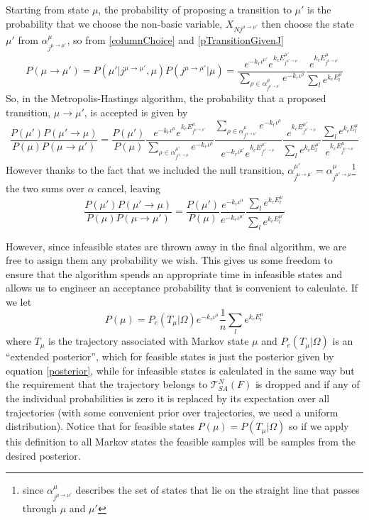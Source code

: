 \documentclass{article}
\begin{document}
Starting from state $\mu$, the probability of proposing a transition to $\mu'$ is the probability that we choose the non-basic variable, $X_{Nj^{\mu\to\mu'}}$ then choose the state $\mu'$ from $\alpha^\mu_{j^{\mu\to\mu'}}$, so from \eqref{columnChoice} and \eqref{pTransitionGivenJ}
\[
P(\mu \rightarrow \mu') 
= 
P(\mu'|j^{\mu\to\mu'},\mu)P(j^{\mu\to\mu'}|\mu) 
=
\frac{e^{-k_r \iota^{\mu'}} e^{k_cE^{\mu'}_{j^{\mu'\to\mu}}}}
	{\sum_{\rho \in \alpha^\mu_{j^{\mu\to\mu'}}}e^{-k_r\iota^\rho}}
\frac{e^{k_c E^\mu_{j^{\mu\to\mu'}}}}
	{\sum_l e^{k_c E^\mu_l}}
\]
So, in the Metropolis-Hastings algorithm, the probability that a proposed transition, $\mu\to\mu'$, is accepted is given by
\[
\frac{P(\mu')P(\mu'\to\mu)}{P(\mu)P(\mu\to\mu')} 
=
\frac{P(\mu')}
	{P(\mu)}
\frac{e^{-k_r \iota^{\mu}}e^{k_cE^{\mu}_{j^{\mu\to\mu'}}}}
	{\sum_{\rho \in \alpha^{\mu'}_{j^{\mu'\to\mu}}}e^{-k_r\iota^\rho}}
\frac{\sum_{\rho \in \alpha^{\mu}_{j^{\mu\to\mu'}}}e^{-k_r\iota^\rho}}
	{e^{-k_r \iota^{\mu'}}e^{k_cE^{\mu'}_{j^{\mu'\to\mu}}}}
\frac{e^{k_c E^{\mu'}_{j^{\mu'\to\mu}}}}
	{\sum_l e^{k_c E^{\mu'}_l}}
\frac{\sum_l e^{k_c E^\mu_l}}
	{e^{k_c E^\mu_{j^{\mu\to\mu'}}}}
\]
However thanks to the fact that we included the null transition,  $\alpha^{\mu'}_{j^{\mu\to\mu'}} = \alpha^\mu_{j^{\mu'\to\mu}}$\footnote{since $\alpha^\mu_{j^{\mu\to\mu'}}$ describes the set of states that lie on the straight line that passes through $\mu$ and $\mu'$} the two sums over $\alpha$ cancel, leaving
\begin{equation}
\frac{P(\mu')P(\mu'\to\mu)}
	{P(\mu)P(\mu\to\mu')} 
=
\frac{P(\mu')}
	{P(\mu)}
\frac{e^{-k_r \iota^{\mu}}}
	{e^{-k_r \iota^{\mu'}}}
\frac{\sum_l e^{k_c E^\mu_l}}
	{\sum_l e^{k_c E^{\mu'}_l}}
\label{acceptance1}
\end{equation}

However, since infeasible states are thrown away in the final algorithm, we are free to assign them any probability we wish. This gives us some freedom to ensure that the algorithm spends an appropriate time in infeasible states and allows us to engineer an acceptance probability that is convenient to calculate. If we let
\begin{equation}
P(\mu) = P_e(T_\mu|\Omega)e^{-k_r \iota^{\mu}} \frac{1}{n}  \sum_l e^{k_c E^\mu_l}
\label{penalty}
\end{equation}
where $T_\mu$ is the trajectory associated with Markov state $\mu$ and $P_e(T_\mu|\Omega)$ is an ``extended posterior'', which for feasible states is just the posterior given by equation \eqref{posterior}, while for infeasible states is calculated in the same way but the requirement that the trajectory belongs to $\mathcal{T}^N_{SA}(F)$ is dropped and if any of the individual probabilities is zero it is replaced by its expectation over all trajectories (with some convenient prior over trajectories, we used a uniform distribution). Notice that for feasible states $P(\mu) = P(T_\mu|\Omega)$ so if we apply this definition to all Markov states the feasible samples will be samples from the desired posterior.
\end{document}
